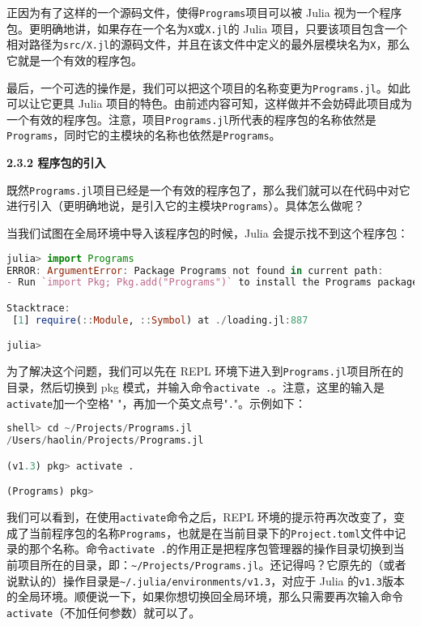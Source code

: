 正因为有了这样的一个源码文件，使得\verb`Programs`项目可以被 Julia 视为一个程序包。更明确地讲，如果存在一个名为\verb`X`或\verb`X.jl`的 Julia 项目，只要该项目包含一个相对路径为\verb`src/X.jl`的源码文件，并且在该文件中定义的最外层模块名为\verb`X`，那么它就是一个有效的程序包。

最后，一个可选的操作是，我们可以把这个项目的名称变更为\verb`Programs.jl`。如此可以让它更具 Julia 项目的特色。由前述内容可知，这样做并不会妨碍此项目成为一个有效的程序包。注意，项目\verb`Programs.jl`所代表的程序包的名称依然是\verb`Programs`，同时它的主模块的名称也依然是\verb`Programs`。

\textbf{2.3.2 程序包的引入}

既然\verb`Programs.jl`项目已经是一个有效的程序包了，那么我们就可以在代码中对它进行引入（更明确地说，是引入它的主模块\verb`Programs`）。具体怎么做呢？

当我们试图在全局环境中导入该程序包的时候，Julia 会提示找不到这个程序包：

\begin{lstlisting}[language=julia]
julia> import Programs
ERROR: ArgumentError: Package Programs not found in current path:
- Run `import Pkg; Pkg.add("Programs")` to install the Programs package.

Stacktrace:
 [1] require(::Module, ::Symbol) at ./loading.jl:887

julia> 
\end{lstlisting}

为了解决这个问题，我们可以先在 REPL 环境下进入到\verb`Programs.jl`项目所在的目录，然后切换到 pkg 模式，并输入命令\verb`activate .`。注意，这里的输入是\verb`activate`加一个空格" "，再加一个英文点号"\verb`.`"。示例如下：

\begin{lstlisting}[language=julia]
shell> cd ~/Projects/Programs.jl
/Users/haolin/Projects/Programs.jl

(v1.3) pkg> activate .

(Programs) pkg> 
\end{lstlisting}

我们可以看到，在使用\verb`activate`命令之后，REPL 环境的提示符再次改变了，变成了当前程序包的名称\verb`Programs`，也就是在当前目录下的\verb`Project.toml`文件中记录的那个名称。命令\verb`activate .`的作用正是把程序包管理器的操作目录切换到当前项目所在的目录，即：\verb`~/Projects/Programs.jl`。还记得吗？它原先的（或者说默认的）操作目录是\verb`~/.julia/environments/v1.3`，对应于 Julia 的\verb`v1.3`版本的全局环境。顺便说一下，如果你想切换回全局环境，那么只需要再次输入命令\verb`activate`（不加任何参数）就可以了。

